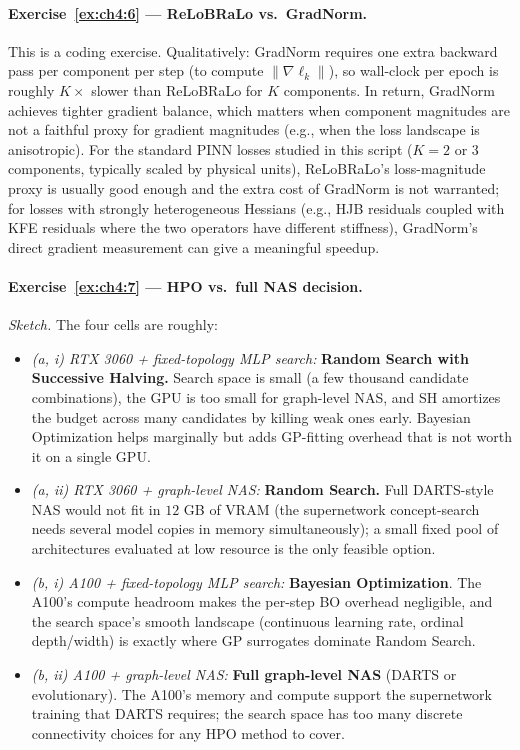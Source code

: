 \documentclass[11pt,a4paper]{report}
\begin{document}
\paragraph{Exercise~\ref{ex:ch4:6} --- ReLoBRaLo vs.\ GradNorm.}
This is a coding exercise.  Qualitatively: GradNorm requires one extra backward pass per component per step (to compute $\|\nabla \ell_k\|$), so wall-clock per epoch is roughly $K\times$ slower than ReLoBRaLo for $K$ components.  In return, GradNorm achieves tighter gradient balance, which matters when component magnitudes are not a faithful proxy for gradient magnitudes (e.g., when the loss landscape is anisotropic).  For the standard PINN losses studied in this script ($K = 2$ or $3$ components, typically scaled by physical units), ReLoBRaLo's loss-magnitude proxy is usually good enough and the extra cost of GradNorm is not warranted; for losses with strongly heterogeneous Hessians (e.g., HJB residuals coupled with KFE residuals where the two operators have different stiffness), GradNorm's direct gradient measurement can give a meaningful speedup.

\paragraph{Exercise~\ref{ex:ch4:7} --- HPO vs.\ full NAS decision.}
\emph{Sketch.}  The four cells are roughly:

\begin{itemize}
\item \emph{(a, i) RTX 3060 + fixed-topology MLP search:} \textbf{Random Search with Successive Halving.}  Search space is small (a few thousand candidate combinations), the GPU is too small for graph-level NAS, and SH amortizes the budget across many candidates by killing weak ones early.  Bayesian Optimization helps marginally but adds GP-fitting overhead that is not worth it on a single GPU.
\item \emph{(a, ii) RTX 3060 + graph-level NAS:} \textbf{Random Search.}  Full DARTS-style NAS would not fit in $12$ GB of VRAM (the supernetwork concept-search needs several model copies in memory simultaneously); a small fixed pool of architectures evaluated at low resource is the only feasible option.
\item \emph{(b, i) A100 + fixed-topology MLP search:} \textbf{Bayesian Optimization}.  The A100's compute headroom makes the per-step BO overhead negligible, and the search space's smooth landscape (continuous learning rate, ordinal depth/width) is exactly where GP surrogates dominate Random Search.
\item \emph{(b, ii) A100 + graph-level NAS:} \textbf{Full graph-level NAS} (DARTS or evolutionary).  The A100's memory and compute support the supernetwork training that DARTS requires; the search space has too many discrete connectivity choices for any HPO method to cover.
\end{itemize}
\end{document}
